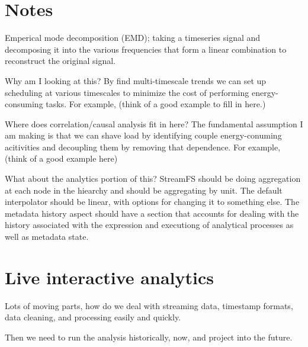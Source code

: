 \section{Notes}

Emperical mode decomposition (EMD); taking a timeseries signal and decomposing it into
the various frequencies that form a linear combination to reconstruct the original signal.


Why am I looking at this?
By find multi-timescale trends we can set up scheduling at various timescales to minimize the cost of
performing energy-consuming tasks.  For example, (think of a good example to fill in here.)


Where does correlation/causal analysis fit in here?
The fundamental assumption I am making is that we can shave load by identifying couple energy-conuming
acitivities and decoupling them by removing that dependence.  For example, (think of a good example here)


What about the analytics portion of this?
StreamFS should be doing aggregation at each node in the hiearchy and should be aggregating by unit.
The default interpolator should be linear, with options for changing it to something else.  The metadata
history aspect should have a section that accounts for dealing with the history associated with
the expression and executiong of analytical processes as well as metadata state.


\section{Live interactive analytics}
Lots of moving parts, how do we deal with streaming data, timestamp formats, data cleaning, and processing easily
and quickly.

Then we need to run the analysis historically, now, and project into the future.